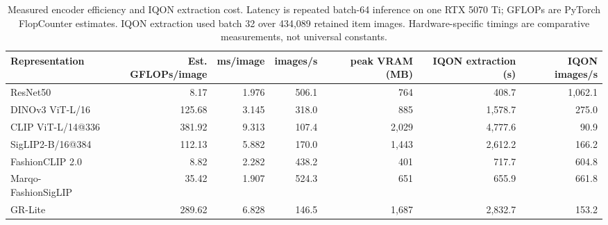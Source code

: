 \begin{table}[htbp]
\caption{Measured encoder efficiency and IQON extraction cost. Latency is repeated batch-64 inference on one RTX 5070 Ti; GFLOPs are PyTorch FlopCounter estimates. IQON extraction used batch 32 over 434,089 retained item images. Hardware-specific timings are comparative measurements, not universal constants.}
\label{tab:efficiency}
\centering
\scriptsize
\begin{tabular}{lrrrrrr}
\toprule
Representation & Est. GFLOPs/image & ms/image & images/s & peak VRAM (MB) & IQON extraction (s) & IQON images/s \\
\midrule
ResNet50 & 8.17 & 1.976 & 506.1 & 764 & 408.7 & 1,062.1 \\
DINOv3 ViT-L/16 & 125.68 & 3.145 & 318.0 & 885 & 1,578.7 & 275.0 \\
CLIP ViT-L/14@336 & 381.92 & 9.313 & 107.4 & 2,029 & 4,777.6 & 90.9 \\
SigLIP2-B/16@384 & 112.13 & 5.882 & 170.0 & 1,443 & 2,612.2 & 166.2 \\
FashionCLIP 2.0 & 8.82 & 2.282 & 438.2 & 401 & 717.7 & 604.8 \\
Marqo-FashionSigLIP & 35.42 & 1.907 & 524.3 & 651 & 655.9 & 661.8 \\
GR-Lite & 289.62 & 6.828 & 146.5 & 1,687 & 2,832.7 & 153.2 \\
\bottomrule
\end{tabular}
\end{table}

